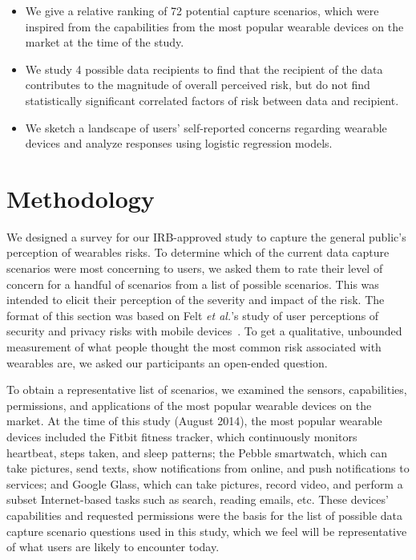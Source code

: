 \documentclass{sig-alternate-hotpets15}
\begin{document}
\begin{itemize} \itemsep1pt \parskip0pt 
\item We give a relative ranking of 72 potential capture scenarios, which were inspired from the capabilities from the most popular wearable devices on the market at the time of the study. 
\item We study 4 possible data recipients to find that the recipient of the data contributes to the magnitude of overall perceived risk, but do not find statistically significant correlated factors of risk between data and recipient. 
\item We sketch a landscape of users' self-reported concerns regarding wearable devices and analyze responses using logistic regression models. 
\end{itemize}

\section{Methodology}
We designed a survey for our IRB-approved study to capture the general public's perception of wearables risks. To determine which of the current data capture scenarios were most concerning to users, we asked them to rate their level of concern for a handful of scenarios from a list of possible scenarios. This was intended to elicit their perception of the severity and impact of the risk. The format of this section was based on Felt {\it et al.}'s study of user perceptions of security and privacy risks with mobile devices~\cite{Felt}. To get a qualitative, unbounded measurement of what people thought the most common risk associated with wearables are, we asked our participants an open-ended question. 

To obtain a representative list of scenarios, we examined the sensors, capabilities, permissions, and applications of the most popular wearable devices on the market. At the time of this study (August 2014), the most popular wearable devices included the Fitbit fitness tracker, which continuously monitors heartbeat, steps taken, and sleep patterns; the Pebble smartwatch, which can take pictures, send texts, show notifications from online, and push notifications to services; and Google Glass, which can take pictures, record video, and perform a subset Internet-based tasks such as search, reading emails, etc. These devices' capabilities and requested permissions were the basis for the list of possible data capture scenario questions used in this study, which we feel will be representative of what users are likely to encounter today.
\end{document}

